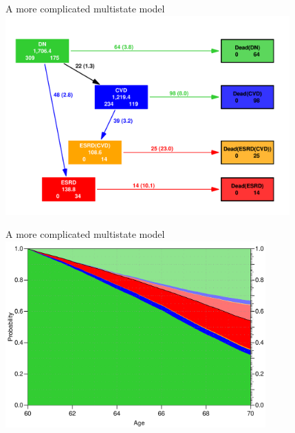 \begin{frame}{A more complicated multistate model}
\vspace*{-1em}
\includegraphics[width=0.82\textwidth]{./GbAd-states.pdf}
\end{frame}

\begin{frame}{A more complicated multistate model}
\includegraphics[width=0.75\textwidth]{./GbAd-probs.pdf}
\end{frame}

